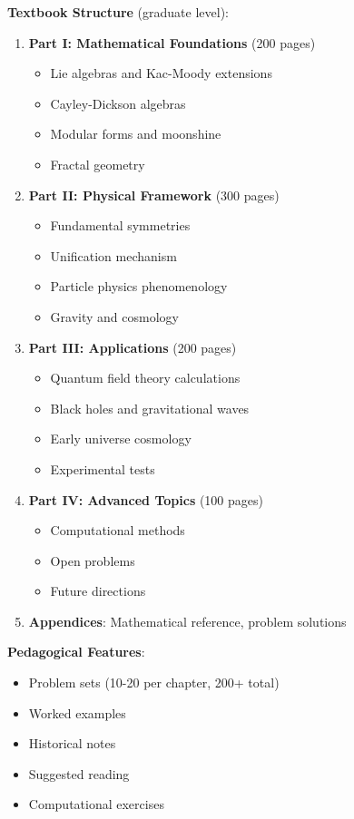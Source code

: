 \textbf{Textbook Structure} (graduate level):
\begin{enumerate}
    \item \textbf{Part I: Mathematical Foundations} (200 pages)
    \begin{itemize}
        \item Lie algebras and Kac-Moody extensions
        \item Cayley-Dickson algebras
        \item Modular forms and moonshine
        \item Fractal geometry
    \end{itemize}

    \item \textbf{Part II: Physical Framework} (300 pages)
    \begin{itemize}
        \item Fundamental symmetries
        \item Unification mechanism
        \item Particle physics phenomenology
        \item Gravity and cosmology
    \end{itemize}

    \item \textbf{Part III: Applications} (200 pages)
    \begin{itemize}
        \item Quantum field theory calculations
        \item Black holes and gravitational waves
        \item Early universe cosmology
        \item Experimental tests
    \end{itemize}

    \item \textbf{Part IV: Advanced Topics} (100 pages)
    \begin{itemize}
        \item Computational methods
        \item Open problems
        \item Future directions
    \end{itemize}

    \item \textbf{Appendices}: Mathematical reference, problem solutions
\end{enumerate}

\textbf{Pedagogical Features}:
\begin{itemize}
    \item Problem sets (10-20 per chapter, 200+ total)
    \item Worked examples
    \item Historical notes
    \item Suggested reading
    \item Computational exercises
\end{itemize}

